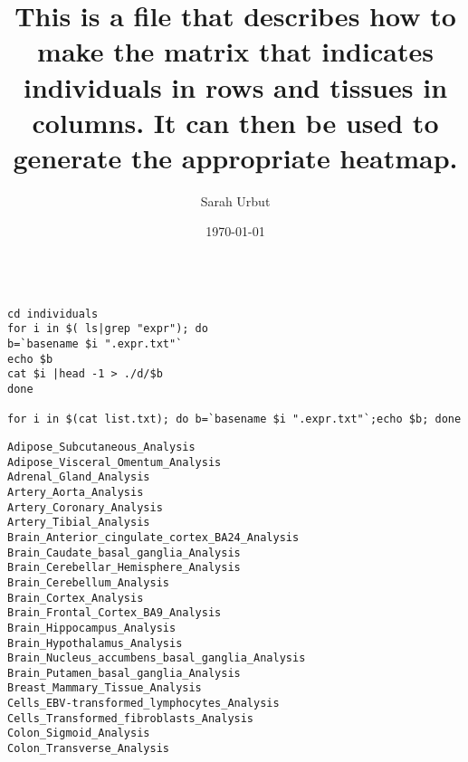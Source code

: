 \documentclass[11pt]{article}
\title{This is a file that describes how to make the matrix that indicates individuals in rows and tissues in columns. It can then be used to generate the appropriate heatmap.}
\author{Sarah Urbut}
\date{\today}
\begin{document}
\maketitle

\setcounter{tocdepth}{3}
\tableofcontents
\vspace*{1cm}


\lstset{breaklines,language=sh}
\begin{lstlisting}

cd individuals
for i in $( ls|grep "expr"); do
b=`basename $i ".expr.txt"`
echo $b
cat $i |head -1 > ./d/$b
done

for i in $(cat list.txt); do b=`basename $i ".expr.txt"`;echo $b; done
\end{lstlisting}


\begin{verbatim}
Adipose_Subcutaneous_Analysis
Adipose_Visceral_Omentum_Analysis
Adrenal_Gland_Analysis
Artery_Aorta_Analysis
Artery_Coronary_Analysis
Artery_Tibial_Analysis
Brain_Anterior_cingulate_cortex_BA24_Analysis
Brain_Caudate_basal_ganglia_Analysis
Brain_Cerebellar_Hemisphere_Analysis
Brain_Cerebellum_Analysis
Brain_Cortex_Analysis
Brain_Frontal_Cortex_BA9_Analysis
Brain_Hippocampus_Analysis
Brain_Hypothalamus_Analysis
Brain_Nucleus_accumbens_basal_ganglia_Analysis
Brain_Putamen_basal_ganglia_Analysis
Breast_Mammary_Tissue_Analysis
Cells_EBV-transformed_lymphocytes_Analysis
Cells_Transformed_fibroblasts_Analysis
Colon_Sigmoid_Analysis
Colon_Transverse_Analysis
\end{verbatim}
\end{document}
